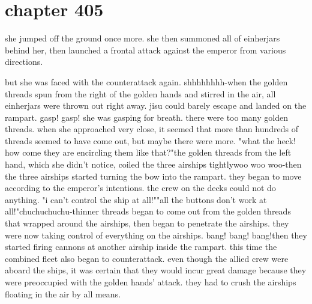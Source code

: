 \section{chapter 405}

she jumped off the ground once more.
 she then summoned all of einherjars behind her, then launched a frontal attack against the emperor from various directions.





but she was faced with the counterattack again.
 shhhhhhhh-when the golden threads spun from the right of the golden hands and stirred in the air, all einherjars were thrown out right away.
jisu could barely escape and landed on the rampart.
gasp! gasp! she was gasping for breath.
 there were too many golden threads.
 when she approached very close, it seemed that more than hundreds of threads seemed to have come out, but maybe there were more.
"what the heck! how come they are encircling them like that?"the golden threads from the left hand, which she didn't notice, coiled the three airships tightlywoo woo woo-then the three airships started turning the bow into the rampart.
 they began to move according to the emperor's intentions.
 the crew on the decks could not do anything.
"i can't control the ship at all!""all the buttons don't work at all!"chuchuchuchu-thinner threads began to come out from the golden threads that wrapped around the airships, then began to penetrate the airships.
 they were now taking control of everything on the airships.
 bang! bang! bang!then they started firing cannons at another airship inside the rampart.
this time the combined fleet also began to counterattack.
 even though the allied crew were aboard the ships, it was certain that they would incur great damage because they were preoccupied with the golden hands' attack.
 they had to crush the airships floating in the air by all means.
 
